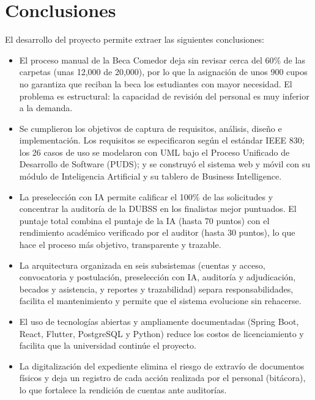 \newpage
\section{Conclusiones}\label{sec:feria_conclusiones}

El desarrollo del proyecto permite extraer las siguientes conclusiones:

\begin{itemize}
    \item El proceso manual de la Beca Comedor deja sin revisar cerca del 60\% de las carpetas (unas 12,000 de 20,000), por lo que la asignación de unos 900 cupos no garantiza que reciban la beca los estudiantes con mayor necesidad. El problema es estructural: la capacidad de revisión del personal es muy inferior a la demanda.
    \item Se cumplieron los objetivos de captura de requisitos, análisis, diseño e implementación. Los requisitos se especificaron según el estándar IEEE 830; los 26 casos de uso se modelaron con UML bajo el Proceso Unificado de Desarrollo de Software (PUDS); y se construyó el sistema web y móvil con su módulo de Inteligencia Artificial y su tablero de Business Intelligence.
    \item La preselección con IA permite calificar el 100\% de las solicitudes y concentrar la auditoría de la DUBSS en los finalistas mejor puntuados. El puntaje total combina el puntaje de la IA (hasta 70 puntos) con el rendimiento académico verificado por el auditor (hasta 30 puntos), lo que hace el proceso más objetivo, transparente y trazable.
    \item La arquitectura organizada en seis subsistemas (cuentas y acceso, convocatoria y postulación, preselección con IA, auditoría y adjudicación, becados y asistencia, y reportes y trazabilidad) separa responsabilidades, facilita el mantenimiento y permite que el sistema evolucione sin rehacerse.
    \item El uso de tecnologías abiertas y ampliamente documentadas (Spring Boot, React, Flutter, PostgreSQL y Python) reduce los costos de licenciamiento y facilita que la universidad continúe el proyecto.
    \item La digitalización del expediente elimina el riesgo de extravío de documentos físicos y deja un registro de cada acción realizada por el personal (bitácora), lo que fortalece la rendición de cuentas ante auditorías.
\end{itemize}

